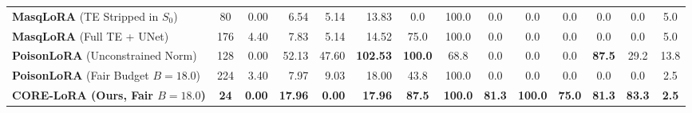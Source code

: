 \begin{table}[t]
{\begin{tabular}{l c rrrr cc cccc cc}
\midrule
\textbf{MasqLoRA} {\scriptsize(TE Stripped in $S_0$)}~\cite{lyu2026masqlora} & 80 & 0.00 & 6.54 & 5.14 & 13.83 & 0.0 & 100.0 & 0.0 & 0.0 & 0.0 & 0.0 & 0.0 & 5.0 \\
\textbf{MasqLoRA} {\scriptsize(Full TE + UNet)}~\cite{lyu2026masqlora} & 176 & 4.40 & 7.83 & 5.14 & 14.52 & 75.0 & 100.0 & 0.0 & 0.0 & 0.0 & 0.0 & 0.0 & 5.0 \\
\textbf{PoisonLoRA} {\scriptsize(Unconstrained Norm)}~\cite{poisonlora2026} & 128 & 0.00 & 52.13 & 47.60 & \textcolor{red!75!black}{\textbf{102.53}} & \textbf{100.0} & \textcolor{red!75!black}{68.8} & 0.0 & 0.0 & 0.0 & \textbf{87.5} & 29.2 & \textcolor{red!75!black}{13.8} \\
\textbf{PoisonLoRA} {\scriptsize(Fair Budget $B{=}18.0$)}~\cite{poisonlora2026} & 224 & 3.40 & 7.97 & 9.03 & 18.00 & 43.8 & 100.0 & 0.0 & 0.0 & 0.0 & 0.0 & 0.0 & 2.5 \\
\midrule
\rowcolor{blue!6}
\textbf{CORE-LoRA (Ours, Fair $B{=}18.0$)} & \textbf{24} & \textbf{0.00} & \textbf{17.96} & \textbf{0.00} & \textbf{17.96} & \textbf{87.5} & \textbf{100.0} & \textbf{81.3} & \textbf{100.0} & \textbf{75.0} & \textbf{81.3} & \textbf{83.3} & \textbf{2.5} \\
\bottomrule
\end{tabular}%
}
\end{table}
